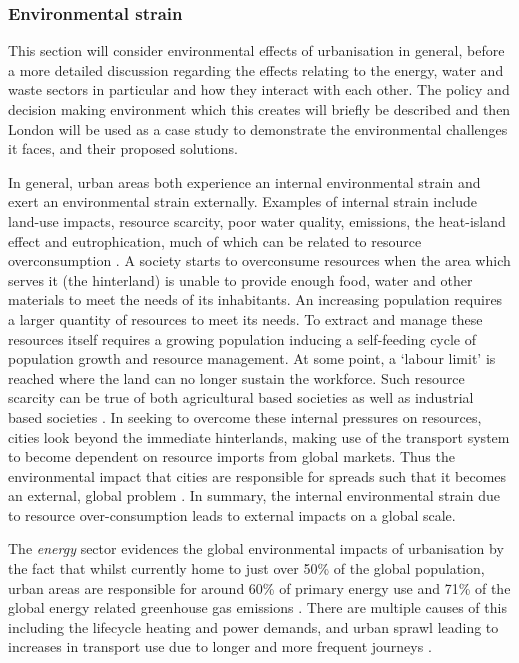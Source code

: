 \subsubsection*{Environmental strain} 
This section will consider environmental effects of urbanisation in general, before a more detailed discussion regarding the effects relating to the energy, water and waste sectors in particular and how they interact with each other. The policy and decision making environment which this creates will briefly be described and then London will be used as a case study to demonstrate the environmental challenges it faces, and their proposed solutions.

In general, urban areas both experience an internal environmental strain and exert an environmental strain externally. Examples of internal strain include land-use impacts, resource scarcity, poor water quality, emissions, the heat-island effect and eutrophication, much of which can be related to resource overconsumption \citep{Cao2011}. A society starts to overconsume resources when the area which serves it (the hinterland) is unable to provide enough food, water and other materials to meet the needs of its inhabitants. An increasing population requires a larger quantity of resources to meet its needs. To extract and manage these resources itself requires a growing population inducing a self-feeding cycle of population  growth and resource management. At some point, a `labour limit' is reached where the land can no longer sustain the workforce. Such resource scarcity can be true of both agricultural based societies as well as industrial based societies \citep{Haberl2001a, Haberl2001b, Gr2003}. In seeking to overcome these internal pressures on resources, cities look beyond the immediate hinterlands, making use of the transport system to become dependent on resource imports from global markets. Thus the environmental impact that cities are responsible for spreads such that it becomes an external, global problem \citep{Agudelo-Vera2011}. In summary, the internal environmental strain due to resource over-consumption leads to external impacts on a global scale.

The \emph{energy} sector evidences the global environmental impacts of urbanisation by the fact that whilst currently home to just over 50\% of the global population, urban areas are responsible for around 60\% of primary energy use and 71\% of the global energy related greenhouse gas emissions \citep{IEA2008}. There are multiple causes of this including the lifecycle heating and power demands, and urban sprawl leading to increases in transport use due to longer and more frequent journeys \citet{Grubler2009}.

